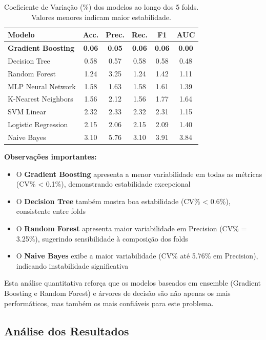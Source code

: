 \documentclass[12pt,a4paper]{article}
\begin{document}
\begin{table}[H]
\centering
\caption{Coeficiente de Variação (\%) dos modelos ao longo dos 5 folds. Valores menores indicam maior estabilidade.}
\label{tab:variability}
\footnotesize
\begin{tabular}{@{}lccccc@{}}
\toprule
\textbf{Modelo} & \textbf{Acc.} & \textbf{Prec.} & \textbf{Rec.} & \textbf{F1} & \textbf{AUC} \\
\midrule
\textbf{Gradient Boosting} & \textbf{0.06} & \textbf{0.05} & \textbf{0.06} & \textbf{0.06} & \textbf{0.00} \\
Decision Tree & 0.58 & 0.57 & 0.58 & 0.58 & 0.48 \\
Random Forest & 1.24 & 3.25 & 1.24 & 1.42 & 1.11 \\
MLP Neural Network & 1.58 & 1.63 & 1.58 & 1.61 & 1.39 \\
K-Nearest Neighbors & 1.56 & 2.12 & 1.56 & 1.77 & 1.64 \\
SVM Linear & 2.32 & 2.33 & 2.32 & 2.31 & 1.15 \\
Logistic Regression & 2.15 & 2.06 & 2.15 & 2.09 & 1.40 \\
Naive Bayes & 3.10 & 5.76 & 3.10 & 3.91 & 3.84 \\
\bottomrule
\end{tabular}
\end{table}

\textbf{Observações importantes:}

\begin{itemize}
    \item O \textbf{Gradient Boosting} apresenta a menor variabilidade em todas as métricas (CV\% < 0.1\%), demonstrando estabilidade excepcional
    \item O \textbf{Decision Tree} também mostra boa estabilidade (CV\% < 0.6\%), consistente entre folds
    \item O \textbf{Random Forest} apresenta maior variabilidade em Precision (CV\% = 3.25\%), sugerindo sensibilidade à composição dos folds
    \item O \textbf{Naive Bayes} exibe a maior variabilidade (CV\% até 5.76\% em Precision), indicando instabilidade significativa
\end{itemize}

Esta análise quantitativa reforça que os modelos baseados em ensemble (Gradient Boosting e Random Forest) e árvores de decisão são não apenas os mais performáticos, mas também os mais confiáveis para este problema.

\subsection{Análise dos Resultados}
\end{document}
